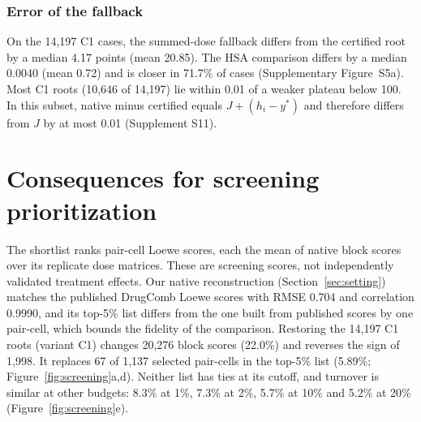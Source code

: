 \documentclass[11pt]{article}
\begin{document}
\subsubsection*{Error of the fallback} On the 14,197 C1 cases, the summed-dose fallback differs from the certified root by a median 4.17 points (mean 20.85). The HSA comparison differs by a median 0.0040 (mean 0.72) and is closer in 71.7\% of cases (Supplementary Figure~S5a). Most C1 roots (10,646 of 14,197) lie within 0.01 of a weaker plateau below 100. In this subset, native minus certified equals $J+(h_i-y^*)$ and therefore differs from $J$ by at most 0.01 (Supplement S11).


\section{Consequences for screening prioritization}\label{sec:screening}
The shortlist ranks pair-cell Loewe scores, each the mean of native block scores over its replicate dose matrices. These are screening scores, not independently validated treatment effects. Our native reconstruction (Section~\ref{sec:setting}) matches the published DrugComb Loewe scores with RMSE 0.704 and correlation 0.9990, and its top-5\% list differs from the one built from published scores by one pair-cell, which bounds the fidelity of the comparison. Restoring the 14,197 C1 roots (variant C1) changes 20,276 block scores (22.0\%) and reverses the sign of 1,998. It replaces 67 of 1,137 selected pair-cells in the top-5\% list (5.89\%; Figure~\ref{fig:screening}a,d). Neither list has ties at its cutoff, and turnover is similar at other budgets: 8.3\% at 1\%, 7.3\% at 2\%, 5.7\% at 10\% and 5.2\% at 20\% (Figure~\ref{fig:screening}e).
\end{document}
